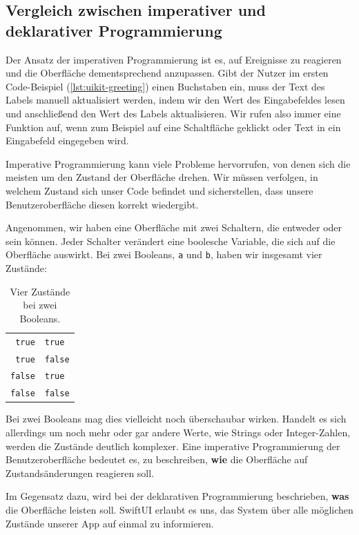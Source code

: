 \subsection{Vergleich zwischen imperativer und deklarativer Programmierung}

Der Ansatz der imperativen Programmierung ist es, auf Ereignisse zu reagieren und die Oberfläche dementsprechend anzupassen. Gibt der Nutzer im ersten Code-Beispiel (\autoref{lst:uikit-greeting}) einen Buchstaben ein, muss der Text des Labels manuell aktualisiert werden, indem wir den Wert des Eingabefeldes lesen und anschließend den Wert des Labels aktualisieren. Wir rufen also immer eine Funktion auf, wenn zum Beispiel auf eine Schaltfläche geklickt oder Text in ein Eingabefeld eingegeben wird.

Imperative Programmierung kann viele Probleme hervorrufen, von denen sich die meisten um den Zustand der Oberfläche drehen. Wir müssen verfolgen, in welchem Zustand sich unser Code befindet und sicherstellen, dass unsere Benutzeroberfläche diesen korrekt wiedergibt.

Angenommen, wir haben eine Oberfläche mit zwei Schaltern, die entweder  oder  sein können. Jeder Schalter verändert eine boolesche Variable, die sich auf die Oberfläche auswirkt. Bei zwei Booleans, \texttt{a} und \texttt{b}, haben wir insgesamt vier Zustände:

\begin{table}[H]
	\centering
\begin{tabular}{rl}
	\thead{\texttt{a}} & \thead{\texttt{b}}\\
	\midrule
	\texttt{true} & \texttt{true}\\
	\texttt{true} & \texttt{false}\\
	\texttt{false} & \texttt{true}\\
	\texttt{false} & \texttt{false}\\
\end{tabular}
\caption{Vier Zustände bei zwei Booleans.}
\end{table}

Bei zwei Booleans mag dies vielleicht noch überschaubar wirken. Handelt es sich allerdings um noch mehr oder gar andere Werte, wie Strings oder Integer-Zahlen, werden die Zustände deutlich komplexer. Eine imperative Programmierung der Benutzeroberfläche bedeutet es, zu beschreiben, \textbf{wie} die Oberfläche auf Zustandsänderungen reagieren soll.

Im Gegensatz dazu, wird bei der deklarativen Programmierung beschrieben, \textbf{was} die Oberfläche leisten soll. SwiftUI erlaubt es uns, das System über alle möglichen Zustände unserer App auf einmal zu informieren.

